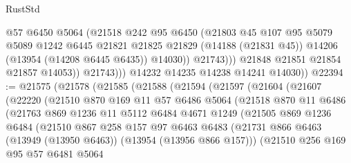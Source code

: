 \begin{lexlean}{RustStd}
\begin{coremodule}
                        @57
                        @6450
                        @5064
                        (@21518
                          @242
                          @95
                          @6450
                          (@21803
                            @45
                            @107
                            @95
                            @5079
                            @5089
                            @1242
                            @6445
                            @21821
                            @21825
                            @21829
                            (@14188 (@21831 @45))
                            @14206
                            (@13954 (@14208 @6445 @6435))
                            @14030))
                        @21743)))
                  @21848
                  @21851
                  @21854
                  @21857
                  @14053))
              @21743)))
        @14232
        @14235
        @14238
        @14241
        @14030))
@22394 := @21575
    (@21578
      (@21585
        (@21588
          (@21594
            (@21597
              (@21604
                (@21607
                  (@22220
                    (@21510
                      @870
                      @169
                      @11
                      @57
                      @6486
                      @5064
                      (@21518
                        @870
                        @11
                        @6486
                        (@21763
                          @869
                          @1236
                          @11
                          @5112
                          @6484
                          @4671
                          @1249
                          (@21505
                            @869
                            @1236
                            @6484
                            (@21510
                              @867
                              @258
                              @157
                              @97
                              @6463
                              @6483
                              (@21731
                                @866
                                @6463
                                (@13949 (@13950 @6463))
                                (@13954 (@13956 @866 @157)))
                              (@21510
                                @256
                                @169
                                @95
                                @57
                                @6481
                                @5064

\end{coremodule}
\end{lexlean}

